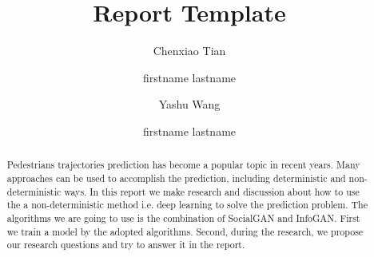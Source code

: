 \documentclass[sigconf]{acmart}
\begin{document}
\title{Report Template}


\author{Chenxiao Tian}

\author{firstname lastname}
\affiliation{\institution{}}

\author{Yashu Wang}

\author{firstname lastname}
\affiliation{\institution{}}

\renewcommand{\shortauthors}{team XX}

\begin{abstract}

Pedestrians trajectories prediction has become a popular topic in recent years. Many approaches can be used to accomplish the prediction, including deterministic and non-deterministic ways. In this report we make research and discussion about how to use the a non-deterministic method i.e. deep learning to solve the prediction problem. The algorithms we are going to use is the combination of SocialGAN and InfoGAN. First we train a model by the adopted algorithms. Second, during the research, we propose our research questions and try to answer it in the report.
\end{abstract}

\maketitle
\end{document}
